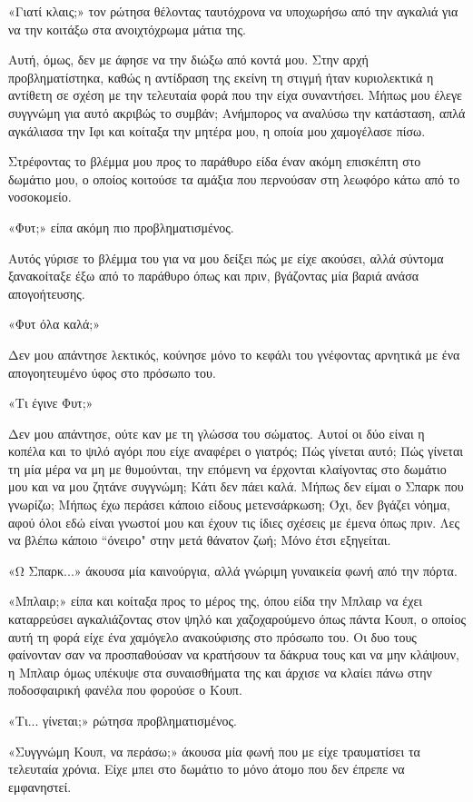 \documentclass[12pt,twoside, openany]{book}
\begin{document}
«Γιατί κλαις;» τον ρώτησα θέλοντας ταυτόχρονα να υποχωρήσω από την αγκαλιά για να την κοιτάξω στα ανοιχτόχρωμα μάτια της. 

Αυτή, όμως, δεν με άφησε να την διώξω από κοντά μου. Στην αρχή προβληματίστηκα, καθώς η αντίδραση της εκείνη τη στιγμή ήταν κυριολεκτικά η αντίθετη σε σχέση με την τελευταία φορά που την είχα συναντήσει. Μήπως μου έλεγε συγγνώμη για αυτό ακριβώς το συμβάν; Ανήμπορος να αναλύσω την κατάσταση, απλά αγκάλιασα την Ιφι και κοίταξα την μητέρα μου, η οποία μου χαμογέλασε πίσω.

Στρέφοντας το βλέμμα μου προς το παράθυρο είδα έναν ακόμη επισκέπτη στο δωμάτιο μου, ο οποίος κοιτούσε τα αμάξια που περνούσαν στη λεωφόρο κάτω από το νοσοκομείο.

«Φυτ;» είπα ακόμη πιο προβληματισμένος.

Αυτός γύρισε το βλέμμα του για να μου δείξει πώς με είχε ακούσει, αλλά σύντομα ξανακοίταξε έξω από το παράθυρο όπως και πριν, βγάζοντας μία βαριά ανάσα απογοήτευσης.

«Φυτ όλα καλά;»

Δεν μου απάντησε λεκτικός, κούνησε μόνο το κεφάλι του γνέφοντας αρνητικά με ένα απογοητευμένο ύφος στο πρόσωπο του.

«Τι έγινε Φυτ;»

Δεν μου απάντησε, ούτε καν με τη γλώσσα του σώματος. Αυτοί οι δύο είναι η κοπέλα και το ψιλό αγόρι που είχε αναφέρει ο γιατρός; Πώς γίνεται αυτό; Πώς γίνεται τη μία μέρα να μη με θυμούνται, την επόμενη να έρχονται κλαίγοντας στο δωμάτιο μου και να μου ζητάνε συγγνώμη; Κάτι δεν πάει καλά. Μήπως δεν είμαι ο Σπαρκ που γνωρίζω; Μήπως έχω περάσει κάποιο είδους μετενσάρκωση; Όχι, δεν βγάζει νόημα, αφού όλοι εδώ είναι γνωστοί μου και έχουν τις ίδιες σχέσεις με έμενα όπως πριν. Λες να βλέπω κάποιο “όνειρο" στην μετά θάνατον ζωή; Μόνο έτσι εξηγείται.

«Ω Σπαρκ...» άκουσα μία καινούργια, αλλά γνώριμη γυναικεία φωνή από την πόρτα.

«Μπλαιρ;» είπα και κοίταξα προς το μέρος της, όπου είδα την Μπλαιρ να έχει καταρρεύσει αγκαλιάζοντας στον ψηλό και χαζοχαρούμενο όπως πάντα Κουπ, ο οποίος αυτή τη φορά είχε ένα χαμόγελο ανακούφισης στο πρόσωπο του. Οι δυο τους φαίνονταν σαν να προσπαθούσαν να κρατήσουν τα δάκρυα τους και να μην κλάψουν, η Μπλαιρ όμως υπέκυψε στα συναισθήματα της και άρχισε να κλαίει πάνω στην ποδοσφαιρική φανέλα που φορούσε ο Κουπ.

«Τι... γίνεται;» ρώτησα προβληματισμένος.

«Συγγνώμη Κουπ, να περάσω;» άκουσα μία φωνή που με είχε τραυματίσει τα τελευταία χρόνια. Είχε μπει στο δωμάτιο το μόνο άτομο που δεν έπρεπε να εμφανηστεί.
\end{document}
